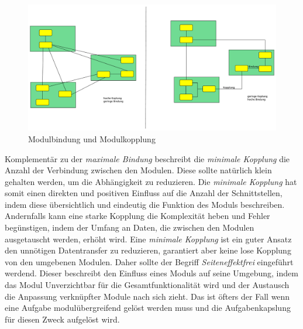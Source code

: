     \begin{figure}[h]
      \includegraphics[width=\textwidth]{material/images/kopplung.pdf}
      \caption{Modulbindung und Modulkopplung \cite{modulMitJava9}}
      \label{fig:kopplung}
    \end{figure}

    Komplementär zu der \textit{maximale Bindung} beschreibt die \textit{minimale Kopplung} die Anzahl der Verbindung zwischen den Modulen. Diese sollte natürlich klein gehalten werden, um die Abhängigkeit zu reduzieren. Die \textit{minimale Kopplung} hat somit einen direkten und positiven Einfluss auf die Anzahl der Schnittstellen, indem diese übersichtlich und eindeutig die Funktion des Moduls beschreiben. Andernfalls kann eine starke Kopplung die Komplexität heben und Fehler begünstigen, indem der Umfang an Daten, die zwischen den Modulen ausgetauscht werden, erhöht wird. Eine \textit{minimale Kopplung} ist ein guter Ansatz den unnötigen Datentransfer zu reduzieren, garantiert aber keine lose Kopplung von den umgebenen Modulen. Daher sollte der Begriff \textit{Seiteneffektfrei} eingeführt werdend. Dieser beschreibt den Einfluss eines Moduls auf seine Umgebung, indem das Modul Unverzichtbar für die Gesamtfunktionalität wird und der Austausch die Anpassung verknüpfter Module nach sich zieht. Das ist öfters der Fall wenn eine Aufgabe modulübergreifend gelöst werden muss und die Aufgabenkapslung für diesen Zweck aufgelöst wird.\cite{softModDes,softMdDes2,modulMitJava9,java9modRevealed,modulProgJava9}

